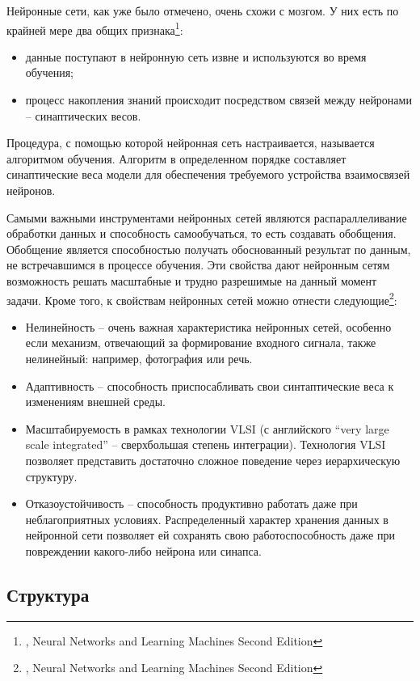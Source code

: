 \documentclass[12pt, a4paper]{article}
\begin{document}
Нейронные сети, как уже было отмечено, очень схожи с мозгом. У них есть по крайней мере два общих признака\footnote{\cite{Khaykin}, Neural Networks and Learning Machines Second Edition}:
\begin{itemize}
		\item	данные поступают в нейронную сеть извне и используются во время обучения;
		\item	процесс накопления знаний происходит посредством связей между нейронами – синаптических весов.
\end{itemize}

Процедура, с помощью которой нейронная сеть настраивается, называется алгоритмом обучения. Алгоритм в определенном порядке составляет синаптические веса модели для обеспечения требуемого устройства взаимосвязей нейронов.

Самыми важными инструментами нейронных сетей являются распараллеливание обработки данных и способность самообучаться, то есть создавать обобщения. Обобщение является способностью получать обоснованный результат по данным, не встречавшимся в процессе обучения. Эти свойства дают нейронным сетям возможность решать масштабные и трудно разрешимые на данный момент задачи. Кроме того, к свойствам нейронных сетей можно отнести следующие\footnote{\cite{Khaykin}, Neural Networks and Learning Machines Second Edition}:
\begin{itemize}
		\item  Нелинейность – очень важная характеристика нейронных сетей, особенно если механизм, отвечающий за формирование входного сигнала, также нелинейный: например, фотография или речь.
		\item  Адаптивность – способность приспосабливать свои синтаптические веса к изменениям внешней среды.
		\item  Масштабируемость в рамках технологии VLSI (с английского “very large scale integrated” – сверхбольшая степень интеграции). Технология VLSI позволяет представить достаточно сложное поведение через иерархическую структуру.
		\item  Отказоустойчивость – способность продуктивно работать даже при неблагоприятных условиях. Распределенный характер хранения данных в нейронной сети позволяет ей сохранять свою работоспособность даже при повреждении какого-либо нейрона или синапса.
\end{itemize}

\subsection{Структура}
\end{document}
